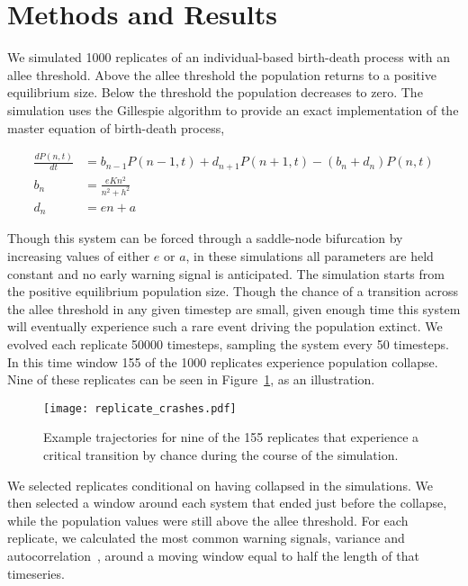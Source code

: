 \documentclass[authoryear,review,12pt]{elsarticle}
\begin{document}
 


\section{Methods and Results}
We simulated 1000 replicates of an individual-based birth-death process
with an allee threshold.  Above the allee threshold the population returns
to a positive equilibrium size.  Below the threshold the population decreases
to zero. The simulation uses the Gillespie algorithm to provide an exact 
implementation of the master equation of birth-death process,

\begin{align}
  \frac{dP(n,t)}{dt} &= b_{n-1} P(n-1,t) + d_{n+1}P(n+1,t) - (b_n+d_n) P(n,t)  \label{master} \\
    b_n &= \frac{e K n^2}{n^2 + h^2} \\
    d_n &= e n + a
\end{align}

Though this system can be forced through a saddle-node bifurcation by
increasing values of either $e$ or $a$, in these simulations all parameters
are held constant and no early warning signal is anticipated.
The simulation starts from the positive equilibrium population size.
Though the chance of a transition across the allee threshold in any 
given timestep are small, given enough time this system will eventually
experience such a rare event driving the population extinct.  We evolved
each replicate 50000 timesteps, sampling the system every 50 timesteps.  
In this time window 155 of the 1000 replicates experience population collapse.  
Nine of these replicates can be seen in Figure~\ref{fig:replicate_crashes},
as an illustration. 

  \begin{figure}[H]
    \begin{center}
      \texttt{[image: replicate\_crashes.pdf]}
    \end{center}
    \caption{Example trajectories for nine of the 155 replicates that 
             experience a critical transition by chance during the course
             of the simulation.}
    \label{fig:replicate_crashes}
  \end{figure}


We selected replicates conditional on having collapsed in the simulations.
We then selected a window around each system that ended just before the
collapse, while the population values were still above the allee threshold.
For each replicate, we calculated the most common warning signals, variance
and autocorrelation~\citep[\emph{e.g.}][]{Carpenter2006,Dakos2008,Scheffer2009}, 
around a moving window equal to half the length of that timeseries.  
\end{document}
